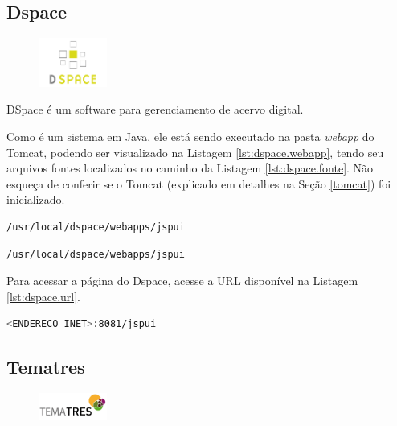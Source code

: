 \subsection{Dspace}\label{dspace}

\begin{figure} %
    \centering
    \includegraphics[width=0.2\textwidth]{../images/dspace.png}
\end{figure}
DSpace é um software para gerenciamento de acervo digital.

Como é um sistema em Java, ele está sendo executado na pasta \textit{webapp} do Tomcat, podendo ser visualizado na Listagem \ref{lst:dspace.webapp}, tendo seu arquivos fontes localizados no caminho da Listagem \ref{lst:dspace.fonte}. Não esqueça de conferir se o Tomcat (explicado em detalhes na Seção \ref{tomcat}) foi inicializado.

\begin{lstlisting}[language=bash, label=lst:dspace.webapp, caption=Onde o Dspace é executado.]
    /usr/local/dspace/webapps/jspui
\end{lstlisting}

\begin{lstlisting}[language=bash, label=lst:dspace.fonte, caption=Onde os arquivos fonte do Dspace estão.]
    /usr/local/dspace/webapps/jspui
\end{lstlisting}


Para acessar a página do Dspace, acesse a URL disponível na Listagem \ref{lst:dspace.url}.

\begin{lstlisting}[language=bash, label=lst:dspace.url, caption=Acessando o Dspace.]
    <ENDERECO INET>:8081/jspui
\end{lstlisting}

\subsection{Tematres}\label{tematres}

\begin{figure} %
    \centering
    \includegraphics[width=0.2\textwidth]{../images/tematres.jpg}
\end{figure}

